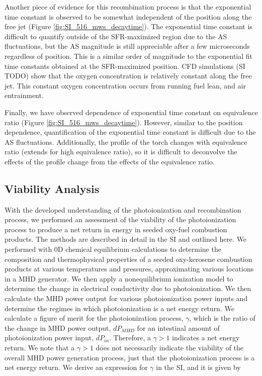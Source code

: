 Another piece of evidence for this recombination process is that the exponential time constant is observed to be somewhat independent of the position along the free jet (Figure \ref*{fig:SI_516_mws_decaytime}). The exponential time constant is difficult to quantify outside of the SFR-maximized region due to the AS fluctuations, but the AS magnitude is still appreciable after a few microseconds regardless of position. This is a similar order of magnitude to the exponential fit time constants obtained at the SFR-maximized position. CFD simulations (SI TODO) show that the oxygen concentration is relatively constant along the free jet. This constant oxygen concentration occurs from running fuel lean, and air entrainment.

Finally, we have observed dependence of exponential time constant on equivalence ratio (Figure \ref*{fig:SI_516_mws_decaytime}). However, similar to the position dependence, quantification of the exponential time constant is difficult due to the AS fluctuations. Additionally, the profile of the torch changes with equivalence ratio (extends for high equivalence ratio), so it is difficult to deconvolve the effects of the profile change from the effects of the equivalence ratio.



\subsection{Viability Analysis}

With the developed understanding of the photoionization and recombination process, we performed an assessment of the viability of the photoionization process to produce a net return in energy in seeded oxy-fuel combustion products. The methods are described in detail in the SI and outlined here. We performed with 0D chemical equilibrium calculations to determine the composition and thermophysical properties of a seeded oxy-kerosene combustion products at various temperatures and pressures, approximating various locations in a MHD generator. We then apply a nonequilibrium ionization model to determine the change in electrical conductivity due to photoionization. We then calculate the MHD power output for various photoionization power inputs and determine the regimes in which photoionization is a net energy return. We calculate a figure of merit for the photoionization process, $\gamma$, which is the ratio of the change in MHD power output, $dP_{MHD}$ for an intestinal amount of photoionization power input, $dP_{in}$. Therefore, a $\gamma > 1$ indicates a net energy return. We note that a $\gamma > 1$ does not necessarily indicate the viability of the overall MHD power generation process, just that the photoionization process is a net energy return. We derive an expression for $\gamma$ in the SI, and it is given by


